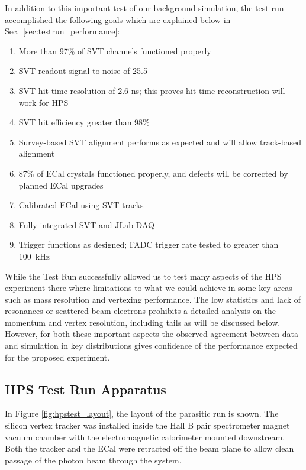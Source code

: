 In addition to this important test of our background simulation, the test run accomplished the following goals which are explained below in Sec.~\ref{sec:testrun_performance}:
\begin{enumerate}
	\item More than 97\% of SVT channels functioned properly
	\item SVT readout signal to noise of 25.5
	\item SVT hit time resolution of 2.6 ns; this proves hit time reconstruction will work for HPS
	\item SVT hit efficiency greater than 98\%
	\item Survey-based SVT alignment performs as expected and will allow track-based alignment
	\item 87\% of ECal crystals functioned properly, and defects will be corrected by planned ECal upgrades
	\item Calibrated ECal using SVT tracks
	\item Fully integrated SVT and JLab DAQ
	\item Trigger functions as designed; FADC trigger rate tested to greater than 100~kHz
\end{enumerate}

While the Test Run successfully allowed us to test many aspects of the HPS experiment there where 
limitations to what we could achieve in some key areas such as mass resolution and vertexing performance. 
The low statistics and lack of resonances or scattered beam electrons 
prohibits a detailed analysis on the momentum and vertex resolution, including tails as will be 
discussed below. However, 
for both these important aspects the observed agreement between data and simulation in key distributions 
gives confidence of the performance expected for the proposed experiment. 




\subsection{HPS Test Run Apparatus } 

In Figure \ref{fig:hpstest_layout}, the layout of the parasitic run is shown. The silicon vertex tracker was installed inside the Hall B pair spectrometer magnet vacuum chamber with the electromagnetic calorimeter mounted downstream.
Both the tracker and the ECal were retracted off the beam plane to allow clean passage of the photon beam through the system.
 
